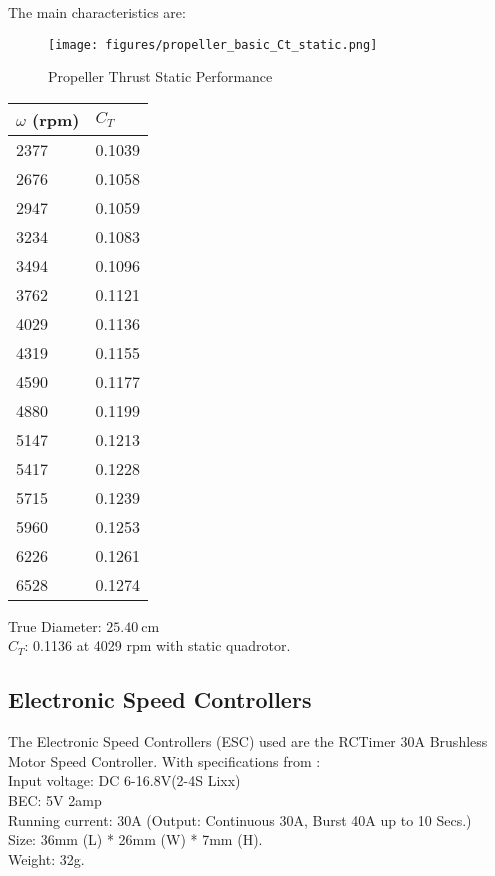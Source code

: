 \documentclass[letterpaper, 12pt]{article}
\begin{document}
The main characteristics are:
\begin{figure}[!htb]
    \centering
    \texttt{[image: figures/propeller\_basic\_Ct\_static.png]}
    \caption{Propeller Thrust Static Performance \cite{propeller_thesis}}
    \label{fig:propeller_summary} 
\end{figure}

\begin{center}
    \begin{tabular}{l l}
        $\omega$ (rpm) & $C_T$ \\
        \hline
        2377 & 0.1039 \\
        2676 & 0.1058 \\
 2947 & 0.1059 \\
 3234 & 0.1083 \\
 3494 & 0.1096 \\
 3762 & 0.1121 \\
 4029 & 0.1136 \\
 4319 & 0.1155 \\
 4590 & 0.1177 \\
 4880 & 0.1199 \\
 5147 & 0.1213 \\
 5417 & 0.1228 \\
 5715 & 0.1239 \\
 5960 & 0.1253 \\
 6226 & 0.1261 \\
 6528 & 0.1274 \\
    \end{tabular}
\end{center}


True Diameter: $\SI{25.40}{\centi\meter}$ \cite{propeller_thesis}\\
$C_T$: 0.1136 at 4029 rpm with static quadrotor.

\subsection{Electronic Speed Controllers}
The Electronic Speed Controllers (ESC) used are the RCTimer 30A Brushless Motor Speed Controller.  With specifications from \cite{ESC_specs}:\\

\noindent Input voltage: DC 6-16.8V(2-4S Lixx)\\
BEC: 5V  2amp\\
Running current: 30A (Output:  Continuous 30A, Burst 40A up to 10 Secs.)\\
Size: 36mm (L) * 26mm (W) * 7mm (H).\\
Weight: 32g.\\
\end{document}
